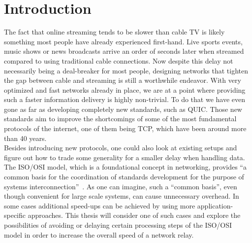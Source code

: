 
\chapter{Introduction}\label{chap:introduction}


The fact that online streaming tends to be slower than cable TV is likely something most people have already 
experienced first-hand.
Live sports events, music shows or news broadcasts arrive an order of seconds later when streamed compared
to using traditional cable connections. %
Now despite this delay not necessarily being a deal-breaker for most people, designing networks that 
tighten the gap between cable and streaming is still a worthwhile endeavor.
With very optimized and fast networks already in place, we are at a point where providing such a faster information
delivery is highly non-trivial.
To do that we have even gone as far as developing completely new standards, such as QUIC\@. 
Those new standards aim to improve the shortcomings of some of the most fundamental protocols of the internet, one of them
being TCP, which have been around more than 40 years. 
\\
Besides introducing new protocols, one could also look at existing setups and figure out how to trade some generality
for a smaller delay when handling data.
The ISO/OSI model, which is a foundational concept in networking, provides ``a common basis for the coordination 
of standards development for the purpose of systems interconnection''~\parencite{iso-osi-standard}.
As one can imagine, such a ``common basis'', even though convenient for large scale systems, can cause unnecessary
overhead.
In some cases additional speed-ups can be achieved by using more application-specific approaches.
This thesis will consider one of such cases and explore the possibilities of avoiding or delaying certain processing
steps of the ISO/OSI model in order to increase the overall speed of a network relay.






